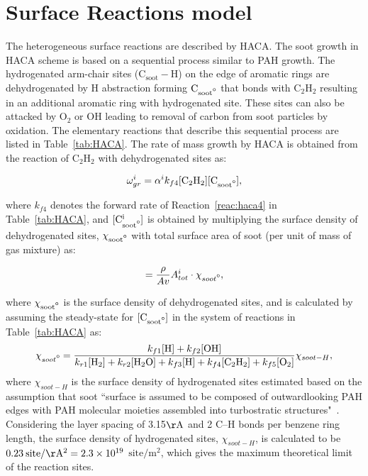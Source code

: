 \section{Surface Reactions model}
\label{sec:surfreacmodel}
The heterogeneous surface reactions are described by HACA. The soot growth in HACA scheme is based on a sequential process similar to PAH growth. The hydrogenated arm-chair sites ($\mathrm{C_{soot}-H}$) on the edge of aromatic rings are dehydrogenated by H abstraction forming $\mathrm{C_{soot\mbox{\textdegree}}}$ that bonds with $\mathrm{C_2H_2}$ resulting in an additional aromatic ring with hydrogenated site. These sites can also be attacked by $\mathrm{O_2}$ or $\mathrm{OH}$ leading to removal of carbon from soot particles by oxidation. The elementary reactions that describe this sequential process are listed in Table~\ref{tab:HACA}.
The rate of mass growth by HACA is obtained from the reaction of $\mathrm{C_2H_2}$ with dehydrogenated sites as:

\begin{equation}
	\omega^i_{gr} = \alpha^i k_{f4} [\mathrm{C_2H_2}][\mathrm{C_{soot\mbox{\textdegree}}}]
	\label{eqn:hacaRate},
\end{equation}

\noindent  where ${k_{f4}}$ denotes the forward rate of Reaction~\eqref{reac:haca4} in Table~\ref{tab:HACA}, and $\mathrm{[C^i_{soot\mbox{\textdegree}}]}$ is obtained by multiplying the surface density of dehydrogenated sites, $\mathrm{\chi_{soot\mbox{\textdegree}}}$ with total surface area of soot (per unit of mass of gas mixture) as:

\begin{equation}
	[\mathrm{C^i_{soot\mbox{\textdegree}}}] = \frac{\rho}{Av}A^i_{tot}\cdot\chi_{soot\mbox{\textdegree}}
	\label{eqn:csoot0},
\end{equation}

\noindent where $\mathrm{\chi_{soot\mbox{\textdegree}}}$ is the surface density of dehydrogenated sites, and is calculated by assuming the steady-state for $\mathrm{[C_{soot\mbox{\textdegree}}]}$ in the system of reactions in Table~\ref{tab:HACA} as:
\begin{equation}
	\chi_{soot{\mbox{\textdegree}}} = 
	\frac
	{k_{f1}[\mathrm{H}]+k_{f2}[\mathrm{OH}]}
	{k_{r1}[\mathrm{H_2}]+k_{r2}[\mathrm{H_2O}]+k_{f3}[\mathrm{H}]+k_{f4}[\mathrm{C_2H_2}]+k_{f5}[\mathrm{O_2}]} \chi_{soot-{H}},
	\label{eqn:chisoot0}
\end{equation}
\noindent where ${\chi_{soot-{H}}}$ is the surface density of hydrogenated sites estimated based on the assumption that soot ``surface is assumed to be composed of outwardlooking PAH edges with PAH molecular moieties assembled into turbostratic structures"~\citep{frenklach2019new}. Considering the layer spacing of 3.15$\mathrm{\AA}$ and 2 C–H bonds per benzene ring length, the surface density of hydrogenated sites, $\chi_{{soot}-H}$, is calculated to be $0.23\:\mathrm{site/\AA^2}=2.3\times10^{19}$ $ \mathrm{site/m^2}$, which gives the maximum theoretical limit of the reaction sites.

